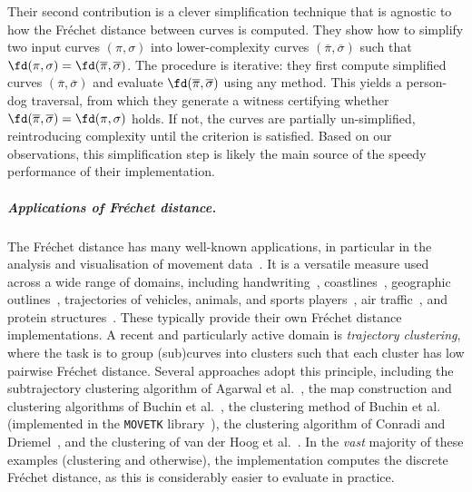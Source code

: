 \documentclass[english, thm-restate, notab]{lipics-v2021}
\begin{document}
Their second contribution is a clever simplification technique that is agnostic to how the Fréchet distance between curves is computed. 
They show how to simplify two input curves $(\pi, \sigma)$ into lower-complexity curves $(\overline{\pi}, \overline{\sigma})$ such that $\fd(\pi, \sigma) = \fd(\overline{\pi}, \overline{\sigma})$. 
The procedure is iterative: they first compute simplified curves $(\overline{\pi}, \overline{\sigma})$ and evaluate $\fd(\overline{\pi}, \overline{\sigma})$ using any method. This yields a person-dog traversal, from which they  generate a witness certifying whether $\fd(\overline{\pi}, \overline{\sigma}) = \fd(\pi, \sigma)$ holds. 
If not, the curves are partially un-simplified, reintroducing complexity until the criterion is satisfied.
Based on our observations, this simplification step is likely the main source of the speedy performance of their implementation.


\subparagraph{Applications of Fréchet distance.}
The Fréchet distance has many well-known applications, in particular in the analysis and visualisation of movement data~\cite{buchin2017clustering, buchin2020group, konzack2017visual, xie2017distributed}. 
It is a versatile measure used across a wide range of domains, including handwriting~\cite{sriraghavendra2007frechet}, coastlines~\cite{mascret2006coastline}, geographic outlines~\cite{devogele2002new}, trajectories of vehicles, animals, and sports players~\cite{acmsurvey20, su2020survey, brakatsoulas2005map, buchin2020group}, air traffic~\cite{bombelli2017strategic}, and protein structures~\cite{jiang2008protein}. 
These typically provide their own Fréchet distance implementations.
A recent and particularly active domain is \emph{trajectory clustering}, where the task is to group (sub)curves into clusters such that each cluster has low pairwise Fréchet distance. 
Several approaches adopt this principle, including the subtrajectory clustering algorithm of Agarwal et al.~\cite{agarwal2018subtrajectory}, the map construction and clustering algorithms of Buchin et al.~\cite{buchin2017clustering, buchin2020improved}, the clustering method of Buchin et al.~\cite{buchin2011detecting} (implemented in the \texttt{MOVETK} library~\cite{MOVETK}), the clustering algorithm of Conradi and Driemel~\cite{conradi2023finding}, and the clustering of van der Hoog et al.~\cite{vanderhoo2025Efficient}. 
In the \emph{vast} majority of these examples (clustering and otherwise), the implementation computes the discrete Fréchet distance, as this is considerably easier to evaluate in practice.
\end{document}
